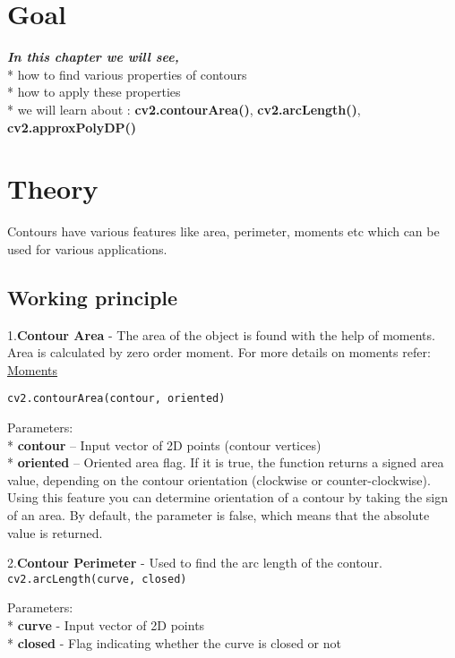 \documentclass[]{article}
\date{}
\begin{document}
\section{Goal}\label{goal}

\emph{\textbf{In this chapter we will see,}} \\
* how to find various
properties of contours\\
* how to apply these properties\\
* we will learn
about : \textbf{cv2.contourArea()}, \textbf{cv2.arcLength()},
\textbf{cv2.approxPolyDP()}

\section{Theory}\label{theory}

Contours have various features like area, perimeter, moments etc which
can be used for various applications.

\subsection{Working principle}\label{working-principle}

1.\textbf{Contour Area} - The area of the object is found with the help
of moments. Area is calculated by zero order moment. For more details on
moments refer:
\href{https://github.com/eyantrainternship/eYSIP_2015_Marker_based_Robot_Localisation/wiki/Moments}{Moments}

\texttt{cv2.contourArea(contour,\ oriented)}

Parameters:\\
* \textbf{contour} -- Input vector of 2D points (contour vertices)\\
* \textbf{oriented} -- Oriented area flag. If it is true, the function
returns a signed area value, depending on the contour orientation
(clockwise or counter-clockwise). Using this feature you can determine
orientation of a contour by taking the sign of an area. By default, the
parameter is false, which means that the absolute value is returned.

2.\textbf{Contour Perimeter} - Used to find the arc length of the
contour.\\
\texttt{cv2.arcLength(curve,\ closed)}

Parameters:\\
* \textbf{curve} - Input vector of 2D points\\
* \textbf{closed} - Flag indicating whether the curve is closed or not
\end{document}
